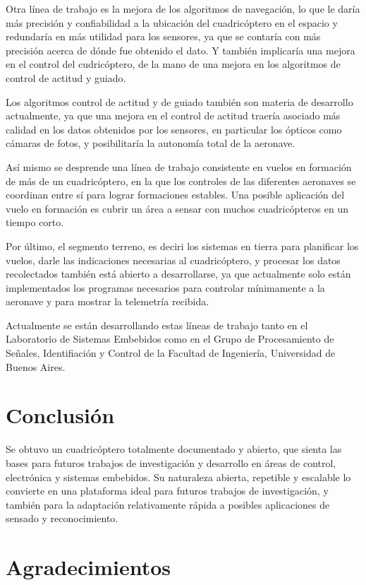\documentclass[a4paper, conference]{IEEEtran}
\begin{document}
Otra línea de trabajo es la mejora de los algoritmos de navegación, lo que le daría más precisión y confiabilidad a la ubicación del cuadricóptero en el espacio y redundaría en más utilidad para los sensores, ya que se contaría con más precisión acerca de dónde fue obtenido el dato. Y también implicaría una mejora en el control del cudricóptero, de la mano de una mejora en los algoritmos de control de actitud y guiado.

Los algoritmos control de actitud y de guiado también son materia de desarrollo actualmente, ya que una mejora en el control de actitud traería asociado más calidad en los datos obtenidos por los sensores, en particular los ópticos como cámaras de fotos, y posibilitaría la autonomía total de la aeronave.

Así mismo se desprende una línea de trabajo consistente en vuelos en formación de más de un cuadricóptero, en la que los controles de las diferentes aeronaves se coordinan entre sí para lograr formaciones estables. Una posible aplicación del vuelo en formación es cubrir un área a sensar con muchos cuadricópteros en un tiempo corto.

Por último, el segmento terreno, es deciri los sistemas en tierra para planificar los vuelos, darle las indicaciones necesarias al cuadricóptero, y procesar los datos recolectados también está abierto a desarrollarse, ya que actualmente solo están implementados los programas necesarios para controlar mínimamente a la aeronave y para mostrar la telemetría recibida.

Actualmente se están desarrollando estas líneas de trabajo tanto en el Laboratorio de Sistemas Embebidos como en el Grupo de Procesamiento de Señales, Identifiación y Control de la Facultad de Ingeniería, Universidad de Buenos Aires.

\section*{Conclusión}

Se obtuvo un cuadricóptero totalmente documentado y abierto, que sienta las bases para futuros trabajos de investigación y desarrollo en áreas de control, electrónica y sistemas embebidos. Su naturaleza abierta, repetible y escalable lo convierte en una plataforma ideal para futuros trabajos de investigación, y también para la adaptación relativamente rápida a posibles aplicaciones de sensado y reconocimiento.

\section*{Agradecimientos}
\end{document}
